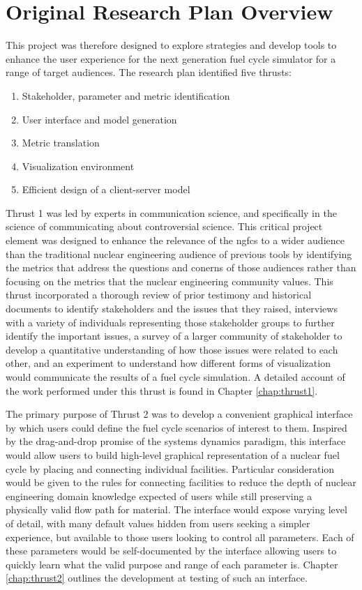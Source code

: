 \section{Original Research Plan Overview}

This project was therefore designed to explore strategies and develop tools to
enhance the user experience for the next generation fuel cycle simulator for a
range of target audiences.  The research plan identified five thrusts:
\begin{enumerate}
  \item Stakeholder, parameter and metric identification
  \item User interface and model generation
  \item Metric translation
  \item Visualization environment
  \item Efficient design of a client-server model
\end{enumerate}

Thrust 1 was led by experts in communication science, and specifically in the
science of communicating about controversial science.  This critical project
element was designed to enhance the relevance of the \gls{ngfcs} to a wider
audience than the traditional nuclear engineering audience of previous tools
by identifying the metrics that address the questions and conerns of those
audiences rather than focusing on the metrics that the nuclear engineering
community values.  This thrust incorporated a thorough review of prior
testimony and historical documents to identify stakeholders and the issues
that they raised, interviews with a variety of individuals representing those
stakeholder groups to further identify the important issues, a survey of a
larger community of stakeholder to develop a quantitative understanding of how
those issues were related to each other, and an experiment to understand how
different forms of visualization would communicate the results of a fuel cycle
simulation.  A detailed account of the work performed under this thrust is
found in Chapter \ref{chap:thrust1}.

The primary purpose of Thrust 2 was to develop a convenient graphical
interface by which users could define the fuel cycle scenarios of interest to
them.  Inspired by the drag-and-drop promise of the systems dynamics paradigm,
this interface would allow users to build high-level graphical representation
of a nuclear fuel cycle by placing and connecting individual facilities.
Particular consideration would be given to the rules for connecting facilities
to reduce the depth of nuclear engineering domain knowledge expected of users
while still preserving a physically valid flow path for material.  The
interface would expose varying level of detail, with many default values
hidden from users seeking a simpler experience, but available to those users
looking to control all parameters.  Each of these parameters would be
self-documented by the interface allowing users to quickly learn what the
valid purpose and range of each parameter is. Chapter \ref{chap:thrust2}
outlines the development at testing of such an interface.

